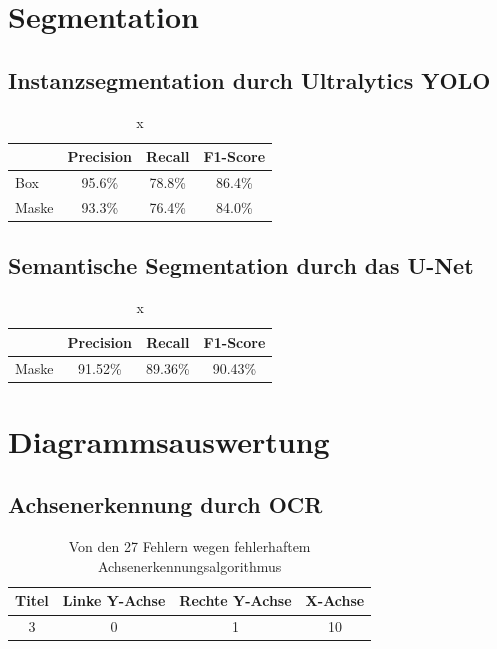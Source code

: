 \section{Segmentation}
\subsection{Instanzsegmentation durch Ultralytics YOLO}
\begin{table}[H]
    \centering
    \begin{tabular}{|l|c|c|c|}
        \hline
        \rowcolor[HTML]{EFEFEF}
              & Precision & Recall & F1-Score \\ \hline
        Box   & 95.6\%    & 78.8\% & 86.4\%   \\ \hline
        Maske & 93.3\%    & 76.4\% & 84.0\%   \\ \hline
    \end{tabular}
    \caption{x}
\end{table}

\subsection{Semantische Segmentation durch das U-Net}
\begin{table}[H]
    \centering
    \begin{tabular}{|l|c|c|c|}
        \hline
        \rowcolor[HTML]{EFEFEF}
              & Precision & Recall  & F1-Score \\ \hline
        Maske & 91.52\%   & 89.36\% & 90.43\%  \\ \hline
    \end{tabular}
    \caption{x}
\end{table}

\section{Diagrammsauswertung}
\subsection{Achsenerkennung durch OCR}
\begin{table}[H]
    \centering
    \begin{tabular}{|c|c|c|c|}
        \hline
        \rowcolor[HTML]{EFEFEF}
        Titel & Linke Y-Achse & Rechte Y-Achse & X-Achse \\ \hline
        3     & 0             & 1              & 10      \\ \hline
    \end{tabular}
    \caption{Von den 27 Fehlern wegen fehlerhaftem Achsenerkennungsalgorithmus}
\end{table}

